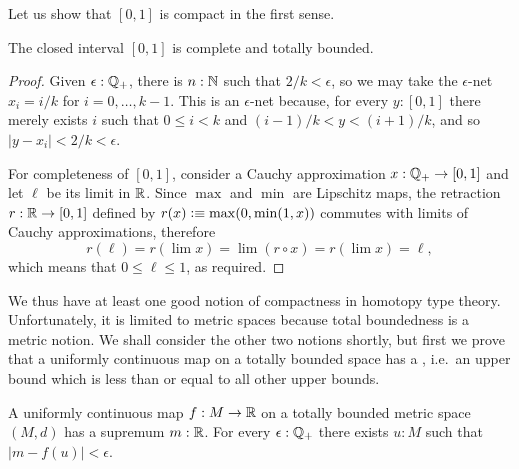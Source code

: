Let us show that $[0,1]$ is compact in the first sense.

\begin{thm} \label{analysis-interval-ctb}
  The closed interval $[0,1]$ is complete and totally bounded.
\end{thm}

\begin{proof}
  Given $\epsilon : \mathbb{Q}_{+}$, there is $n : \mathbb{N}$ such that $2/k < \epsilon$, so we may take the
  $\epsilon$-net $x_i = i/k$ for $i = 0, \ldots, k-1$. This is an $\epsilon$-net because,
  for every $y : [0,1]$ there merely exists $i$ such that $0 \leq i < k$ and $(i -
  1)/k < y < (i+1)/k$, and so $|y - x_i| < 2/k < \epsilon$.

  For completeness of $[0,1]$, consider a Cauchy approximation $x : \mathbb{Q}_{+} \to
  [0,1]$ and let $\ell$ be its limit in $\mathbb{R}$. Since $\max$ and $\min$ are Lipschitz maps,
  the retraction $r : \mathbb{R} \to [0,1]$ defined by $r(x) \vcentcolon\equiv \max(0, \min(1, x))$ commutes
  with limits of Cauchy approximations, therefore
  \begin{equation*}
    r(\ell) =
    r (\lim x) =
    \lim (r \circ x) =
    r (\lim x) =
    \ell,
  \end{equation*}
  which means that $0 \leq \ell \leq 1$, as required.
\end{proof}

We thus have at least one good notion of compactness in homotopy type theory.
Unfortunately, it is limited to metric spaces because total boundedness is a metric
notion. We shall consider the other two notions shortly, but first we prove that a
uniformly continuous map on a totally bounded space has a ,
i.e.\ an upper bound which is less than or equal to all other upper bounds.

\begin{thm} \label{ctb-uniformly-continuous-sup}
  A uniformly continuous map $f : M \to \mathbb{R}$ on a totally bounded metric space
  $(M, d)$ has a supremum $m : \mathbb{R}$. For every $\epsilon : \mathbb{Q}_{+}$ there exists $u : M$ such
  that $|m - f(u)| < \epsilon$.
\end{thm}

